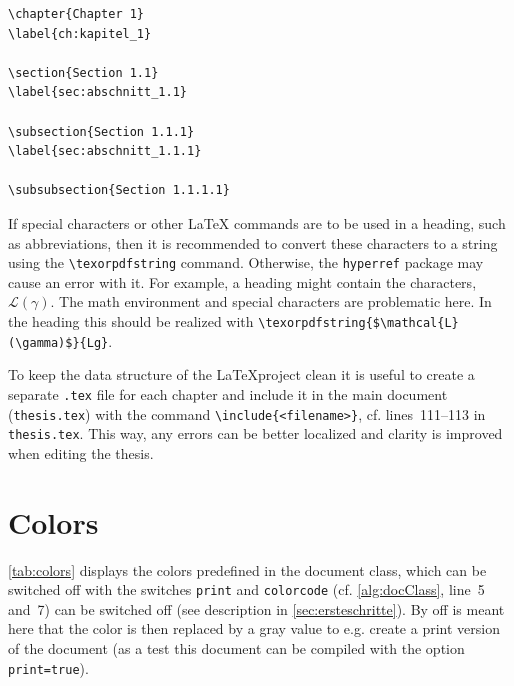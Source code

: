 \begin{lstlisting}[float=ht,keywordsprefix={\\},keywordstyle=\color{kwcolor}\bfseries,language={[LaTeX]TeX}, caption={Chapters and Sections},label={alg:chapsNsecs}]
\chapter{Chapter 1}
\label{ch:kapitel_1}

\section{Section 1.1}
\label{sec:abschnitt_1.1}

\subsection{Section 1.1.1}
\label{sec:abschnitt_1.1.1}

\subsubsection{Section 1.1.1.1}
\end{lstlisting}

If special characters or other \LaTeX{} commands are to be used in a heading, such as abbreviations, then it is recommended to convert these characters to a string using the \texttt{\textbackslash{}texorpdfstring} command.
Otherwise, the \texttt{hyperref} package may cause an error with it.
For example, a heading might contain the characters, $\mathcal{L}(\gamma)$.
The math environment and special characters are problematic here.
In the heading this should be realized with \texttt{\textbackslash{}texorpdfstring\{\$\textbackslash{}mathcal\{L\}(\textbackslash{}gamma)\$\}\{Lg\}}.

To keep the data structure of the \LaTeX project clean it is useful to create a separate \texttt{.tex} file for each chapter and include it in the main document (\texttt{thesis.tex}) with the command \texttt{\textbackslash{}include\{<filename>\}}, cf. lines~111--113 in \texttt{thesis.tex}.
This way, any errors can be better localized and clarity is improved when editing the thesis.

\section{Colors}

\cref{tab:colors} displays the colors predefined in the document class, which can be switched off with the switches \texttt{print} and \texttt{colorcode} (cf. \cref{alg:docClass}, line~5 and~7) \glqq{}can be switched off\grqq{} (see description in \cref{sec:ersteschritte}).
By \glqq{}off\grqq{} is meant here that the color is then replaced by a gray value to e.g. create a print version of the document (as a test this document can be compiled with the option \texttt{print=true}).

